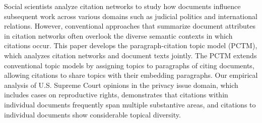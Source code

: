 Social scientists analyze citation networks to study how documents influence subsequent work across various domains such as judicial politics and international relations. 
However, conventional approaches that summarize document attributes in citation networks often overlook the diverse semantic contexts in which citations occur. 
This paper develops the paragraph-citation topic model (PCTM), which analyzes citation networks and document texts jointly. 
The PCTM extends conventional topic models by assigning topics to paragraphs of citing documents, allowing citations to share topics with their embedding paragraphs. 
Our empirical analysis of U.S. Supreme Court opinions in the privacy issue domain, which includes cases on reproductive rights, demonstrates that citations within individual documents frequently span multiple substantive areas, and citations to individual documents show considerable topical diversity. 
